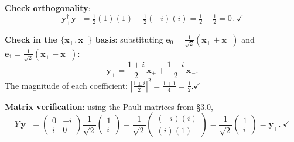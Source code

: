 \documentclass[12pt,a4paper]{article}
\begin{document}
\textbf{Check orthogonality}:
\[
    \mathbf{y}_+^\dagger\mathbf{y}_- = \tfrac{1}{2}(1)(1) + \tfrac{1}{2}(-i)(i) = \tfrac{1}{2}-\tfrac{1}{2}=0.\;\checkmark
\]

\textbf{Check in the $\{\mathbf{x}_+,\mathbf{x}_-\}$ basis}: substituting $\mathbf{e}_0=\frac{1}{\sqrt{2}}(\mathbf{x}_++\mathbf{x}_-)$ and $\mathbf{e}_1=\frac{1}{\sqrt{2}}(\mathbf{x}_+-\mathbf{x}_-)$:
\[
    \mathbf{y}_+ = \frac{1+i}{2}\,\mathbf{x}_+ + \frac{1-i}{2}\,\mathbf{x}_-.
\]
The magnitude of each coefficient: $\left|\frac{1\pm i}{2}\right|^2 = \frac{1+1}{4}=\frac{1}{2}$.\;$\checkmark$

\textbf{Matrix verification}: using the Pauli matrices from \S3.0,
\[
    Y\,\mathbf{y}_+ = \begin{pmatrix}0&-i\\i&0\end{pmatrix}\frac{1}{\sqrt{2}}\begin{pmatrix}1\\i\end{pmatrix}
    = \frac{1}{\sqrt{2}}\begin{pmatrix}(-i)(i)\\(i)(1)\end{pmatrix}
    = \frac{1}{\sqrt{2}}\begin{pmatrix}1\\i\end{pmatrix}
    = \mathbf{y}_+.\;\checkmark
\]
\end{document}
